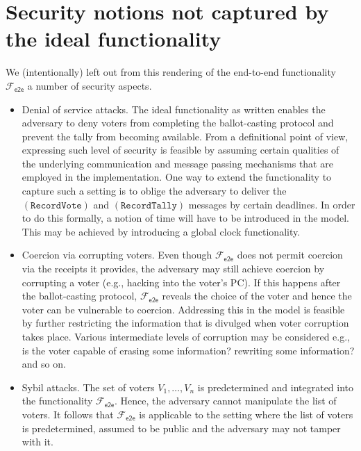 \documentclass[11pt,letterpaper]{article}
\newcommand{\func}[1][\relax]{\ensuremath{\mathcal{F}_{\mathsf{#1}}}}
\newcommand{\fete}{\func[e2e]}%
\def\RecordVote{\mathtt{RecordVote}}
\def\RecordTally{\mathtt{RecordTally}}
\begin{document}
\section{Security notions not captured by the ideal functionality}

We (intentionally) left out from this rendering of 
 the end-to-end functionality  $\fete$ a number of security aspects. 

\begin{itemize}
\item Denial of service attacks. The ideal functionality as written enables the adversary
to deny voters from completing the ballot-casting protocol and prevent the tally
from becoming available. From a definitional point of view, expressing such level of security
is feasible by assuming certain qualities of the underlying communication and 
message passing mechanisms that are employed in the implementation. One way to extend the functionality 
to capture such a setting is to oblige the adversary to deliver the $(\RecordVote)$
and $(\RecordTally)$ messages by certain deadlines. In order to do this formally, 
a notion
of time will have to be introduced in the model. This may
be achieved by introducing a global clock functionality.

\item Coercion via corrupting voters. Even though $\fete$ does not permit coercion
via the receipts it provides, the adversary may still achieve coercion by corrupting a voter
(e.g., hacking into the voter's PC). If this happens after the ballot-casting protocol, 
$\fete$ reveals the choice of the voter and hence the voter can be vulnerable  to coercion. 
Addressing this in the model is feasible by further restricting the information that is
divulged when voter corruption takes place. Various intermediate levels of corruption
may be considered e.g., is the voter capable of erasing some information? rewriting some information? and so on.

\item Sybil attacks. The set of voters $V_1,\ldots,V_n$ is predetermined and integrated into
the functionality $\fete$. Hence, the adversary cannot manipulate the list of voters.
It follows that $\fete$ is applicable to the setting where
the list of voters is predetermined, assumed to be public and the adversary 
may not tamper with it. 
\end{itemize}
\end{document}

